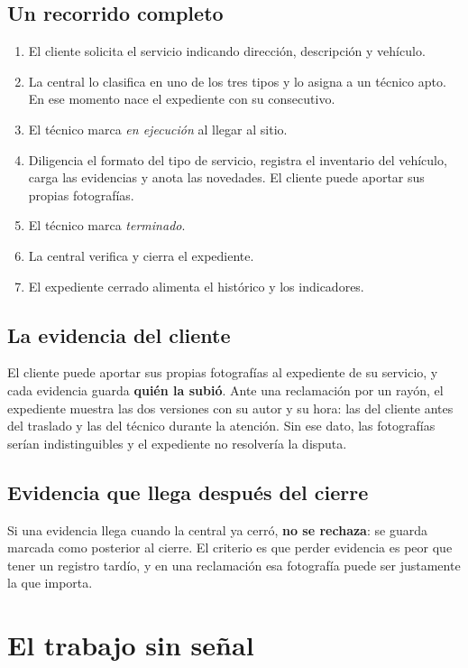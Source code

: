 \subsection{Un recorrido completo}

\begin{enumerate}
  \item El cliente solicita el servicio indicando dirección, descripción y
        vehículo.
  \item La central lo clasifica en uno de los tres tipos y lo asigna a un técnico
        apto. En ese momento nace el expediente con su consecutivo.
  \item El técnico marca \emph{en ejecución} al llegar al sitio.
  \item Diligencia el formato del tipo de servicio, registra el inventario del
        vehículo, carga las evidencias y anota las novedades. El cliente puede
        aportar sus propias fotografías.
  \item El técnico marca \emph{terminado}.
  \item La central verifica y cierra el expediente.
  \item El expediente cerrado alimenta el histórico y los indicadores.
\end{enumerate}

\subsection{La evidencia del cliente}

El cliente puede aportar sus propias fotografías al expediente de su servicio, y
cada evidencia guarda \textbf{quién la subió}. Ante una reclamación por un rayón,
el expediente muestra las dos versiones con su autor y su hora: las del cliente
antes del traslado y las del técnico durante la atención. Sin ese dato, las
fotografías serían indistinguibles y el expediente no resolvería la disputa.

\subsection{Evidencia que llega después del cierre}

Si una evidencia llega cuando la central ya cerró, \textbf{no se rechaza}: se
guarda marcada como posterior al cierre. El criterio es que perder evidencia es
peor que tener un registro tardío, y en una reclamación esa fotografía puede ser
justamente la que importa.

\section{El trabajo sin señal}

